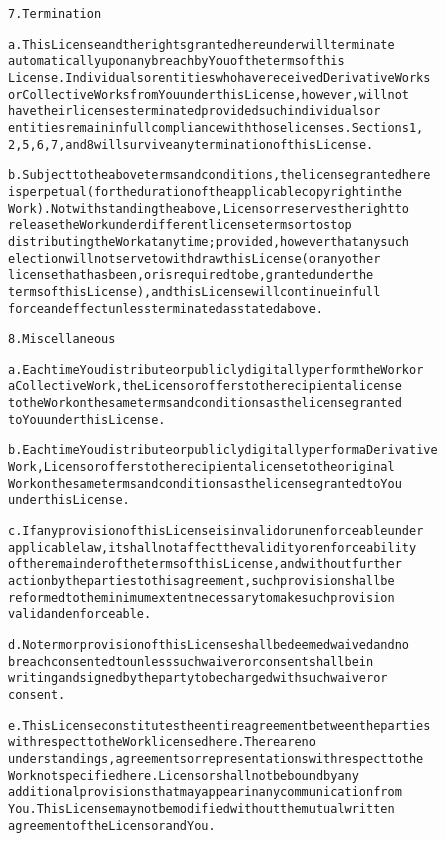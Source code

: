 \documentclass{report}
\begin{document}
\begin{alltt}
7. Termination

a. This License and the rights granted hereunder will terminate
   automatically upon any breach by You of the terms of this
   License. Individuals or entities who have received Derivative Works
   or Collective Works from You under this License, however, will not
   have their licenses terminated provided such individuals or
   entities remain in full compliance with those licenses. Sections 1,
   2, 5, 6, 7, and 8 will survive any termination of this License.

b. Subject to the above terms and conditions, the license granted here
   is perpetual (for the duration of the applicable copyright in the
   Work). Notwithstanding the above, Licensor reserves the right to
   release the Work under different license terms or to stop
   distributing the Work at any time; provided, however that any such
   election will not serve to withdraw this License (or any other
   license that has been, or is required to be, granted under the
   terms of this License), and this License will continue in full
   force and effect unless terminated as stated above.

8. Miscellaneous

a. Each time You distribute or publicly digitally perform the Work or
   a Collective Work, the Licensor offers to the recipient a license
   to the Work on the same terms and conditions as the license granted
   to You under this License.

b. Each time You distribute or publicly digitally perform a Derivative
   Work, Licensor offers to the recipient a license to the original
   Work on the same terms and conditions as the license granted to You
   under this License.

c. If any provision of this License is invalid or unenforceable under
   applicable law, it shall not affect the validity or enforceability
   of the remainder of the terms of this License, and without further
   action by the parties to this agreement, such provision shall be
   reformed to the minimum extent necessary to make such provision
   valid and enforceable.

d. No term or provision of this License shall be deemed waived and no
   breach consented to unless such waiver or consent shall be in
   writing and signed by the party to be charged with such waiver or
   consent.

e. This License constitutes the entire agreement between the parties
   with respect to the Work licensed here. There are no
   understandings, agreements or representations with respect to the
   Work not specified here. Licensor shall not be bound by any
   additional provisions that may appear in any communication from
   You. This License may not be modified without the mutual written
   agreement of the Licensor and You.


\end{alltt}
\end{document}
